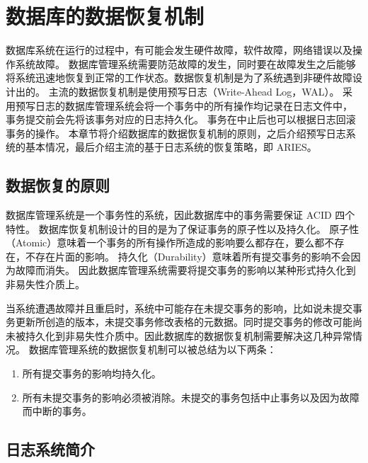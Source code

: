 \section{数据库的数据恢复机制}

数据库系统在运行的过程中，有可能会发生硬件故障，软件故障，网络错误以及操作系统故障。
数据库管理系统需要防范故障的发生，同时要在故障发生之后能够将系统迅速地恢复到正常的工作状态。数据恢复机制是为了系统遇到非硬件故障设计出的。
主流的数据恢复机制是使用预写日志（Write-Ahead Log，WAL）。
采用预写日志的数据库管理系统会将一个事务中的所有操作均记录在日志文件中，
事务提交前会先将该事务对应的日志持久化。
事务在中止后也可以根据日志回滚事务的操作。
本章节将介绍数据库的数据恢复机制的原则，之后介绍预写日志系统的基本情况，最后介绍主流的基于日志系统的恢复策略，即 ARIES。

\subsection{数据恢复的原则}

数据库管理系统是一个事务性的系统，因此数据库中的事务需要保证 ACID 四个特性。
数据库恢复机制设计的目的是为了保证事务的原子性以及持久化。
原子性（Atomic）意味着一个事务的所有操作所造成的影响要么都存在，要么都不存在，不存在片面的影响。
持久化（Durability）意味着所有提交事务的影响不会因为故障而消失。
因此数据库管理系统需要将提交事务的影响以某种形式持久化到非易失性介质上。

当系统遭遇故障并且重启时，系统中可能存在未提交事务的影响，比如说未提交事务更新所创造的版本，未提交事务修改表格的元数据。同时提交事务的修改可能尚未被持久化到非易失性介质中。因此数据库的数据恢复机制需要解决这几种异常情况。
数据库管理系统的数据恢复机制可以被总结为以下两条：
\begin{enumerate}
    \item 所有提交事务的影响均持久化。
    \item 所有未提交事务的影响必须被消除。未提交的事务包括中止事务以及因为故障而中断的事务。
\end{enumerate}


\subsection{日志系统简介}

